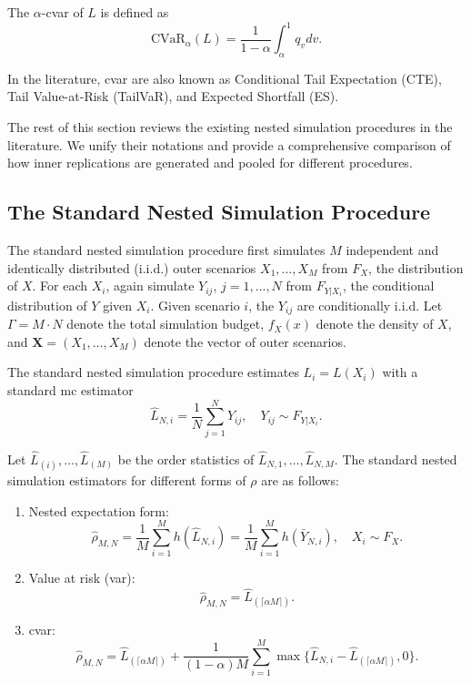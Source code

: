 The $\alpha$-\gls{cvar} of $L$ is defined as
\begin{equation}\label{eq1:cvar}
    \mbox{CVaR}_\alpha(L) =\frac{1}{1-\alpha} \int_{\alpha}^{1} q_v dv. 
\end{equation}

In the literature, \gls{cvar} are also known as Conditional Tail Expectation (CTE), Tail Value-at-Risk (TailVaR), and Expected Shortfall (ES).

The rest of this section reviews the existing nested simulation procedures in the literature.
We unify their notations and provide a comprehensive comparison of how inner replications are generated and pooled for different procedures.

\subsection{The Standard Nested Simulation Procedure}

The standard nested simulation procedure first simulates $M$ independent and identically distributed (i.i.d.) outer scenarios $X_1, \dots, X_M$ from $F_X$, the distribution of $X$.
For each $X_i$, again simulate $Y_{ij}$, $j = 1, \dots, N$ from $F_{Y|X_i}$, the conditional distribution of $Y$ given $X_i$.
Given scenario $i$, the $Y_{ij}$ are conditionally i.i.d.
Let $\Gamma = M \cdot N$ denote the total simulation budget, $f_X(x)$ denote the density of $X$, and $\mathbf{X} = (X_1, \dots, X_M)$ denote the vector of outer scenarios.

The standard nested simulation procedure estimates $L_i = L(X_i)$ with a standard \gls{mc} estimator 
\begin{equation*}
  \hat{L}_{N, i} = \frac{1}{N} \sum_{j=1}^N Y_{ij}, \quad Y_{ij} \sim F_{Y|X_i}.  
\end{equation*}

Let $\hat{L}_{(i)}, \dots, \hat{L}_{(M)}$ be the order statistics of $\hat{L}_{N, 1}, \dots, \hat{L}_{N, M}$. 
The standard nested simulation estimators for different forms of $\rho$ are as follows:

\begin{enumerate}
    \item   Nested expectation form:
            \begin{equation*}
                \hat{\rho}_{M, N} = \frac{1}{M} \sum_{i=1}^M h(\hat{L}_{N, i}) = \frac{1}{M} \sum_{i=1}^M h(\bar{Y}_{N, i}), \quad X_i \sim F_X.
            \end{equation*}
    \item   Value at risk (\gls{var}):
            \begin{equation*}
                \hat{\rho}_{M, N} = \hat{L}_{(\lceil \alpha M \rceil)}.
            \end{equation*}

    \item   \gls{cvar}:
            \begin{equation}\label{eq1:cvar-hat}
                \hat{\rho}_{M, N} = \hat{L}_{(\lceil \alpha M \rceil)} + \frac{1}{(1-\alpha) M} \sum_{i=1}^M \max \{\hat{L}_{N, i} - \hat{L}_{(\lceil \alpha M \rceil)}, 0 \}.
            \end{equation}
\end{enumerate}

